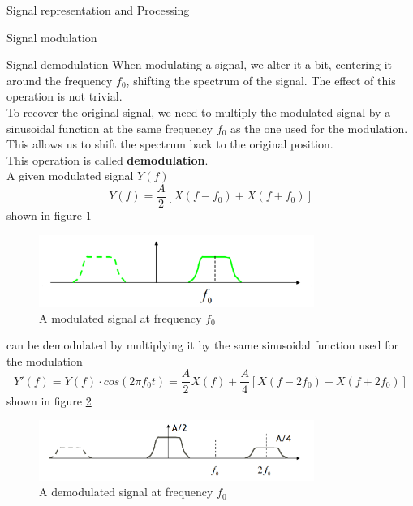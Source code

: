 \begin{section}{Signal representation and Processing}
\begin{subsection}{Signal modulation}
    \end{subsection}
    \begin{subsection}{Signal demodulation}
      When modulating a signal, we alter it a bit, centering it around the frequency $f_0$, shifting
      the spectrum of the signal. The effect of this operation is not trivial.\\
      To recover the original signal, we need to multiply the modulated signal by a sinusoidal
      function at the same frequency $f_0$ as the one used for the modulation. This allows us to
      shift the spectrum back to the original position.\\
      This operation is called \textbf{demodulation}.\\
      A given modulated signal $Y(f)$
      \begin{equation}
        Y(f) = \frac{A}{2}[X(f-f_0) + X(f+f_0)]
      \end{equation}
      shown in figure \ref{fig:Demodulation1}
      \begin{figure}[h]
        \centering
        \includegraphics[width=0.8\textwidth]{img/demodulation1.png}
        \caption{A modulated signal at frequency $f_0$}
        \label{fig:Demodulation1}
      \end{figure}
      can be demodulated by multiplying it by the same sinusoidal function used for the modulation
      \begin{equation}
        Y'(f) = Y(f) \cdot cos(2\pi f_0 t)= \frac{A}{2}X(f)+\frac{A}{4}[X(f-2f_0)+X(f+2f_0)]
      \end{equation}
      shown in figure \ref{fig:Demodulation2}\\
      \begin{figure}[h]
        \centering
        \includegraphics[width=0.8\textwidth]{img/demodulation2.png}
        \caption{A demodulated signal at frequency $f_0$}
        \label{fig:Demodulation2}
      \end{figure}

\end{subsection}
\end{section}
